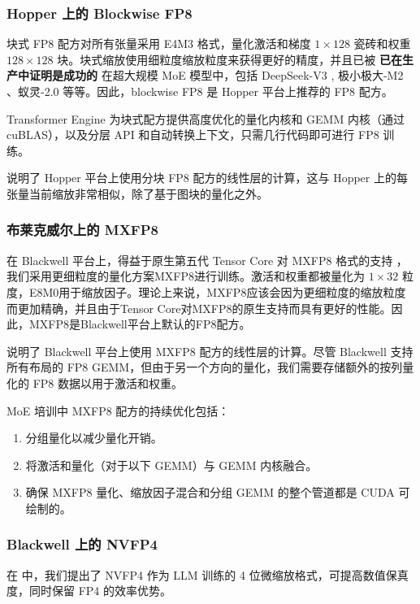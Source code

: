 \subsubsection{Hopper 上的 Blockwise FP8}
块式 FP8 配方对所有张量采用 E4M3 格式，量化激活和梯度 $1 \times 128$ 瓷砖和权重 $128 \times 128$ 块。块式缩放使用细粒度缩放粒度来获得更好的精度，并且已被 \textbf{已在生产中证明是成功的} 在超大规模 MoE 模型中，包括 DeepSeek-V3 \cite{deepseekai2025deepseekv3technicalreport}, 极小极大-M2 \cite{minimax_m2}、蚁灵-2.0 \cite{li2025every}等等。因此，blockwise FP8 是 Hopper 平台上推荐的 FP8 配方。

Transformer Engine 为块式配方提供高度优化的量化内核和 GEMM 内核（通过 cuBLAS），以及分层 API 和自动转换上下文，只需几行代码即可进行 FP8 训练。

 说明了 Hopper 平台上使用分块 FP8 配方的线性层的计算，这与 Hopper 上的每张量当前缩放非常相似，除了基于图块的量化之外。

\subsubsection{布莱克威尔上的 MXFP8}
在 Blackwell 平台上，得益于原生第五代 Tensor Core 对 MXFP8 格式的支持 \cite{rouhani2023microscalingdataformatsdeep}，我们采用更细粒度的量化方案MXFP8进行训练。激活和权重都被量化为 $1 \times 32$ 粒度，E8M0用于缩放因子。理论上来说，MXFP8应该会因为更细粒度的缩放粒度而更加精确，并且由于Tensor Core对MXFP8的原生支持而具有更好的性能。因此，MXFP8是Blackwell平台上默认的FP8配方。

 说明了 Blackwell 平台上使用 MXFP8 配方的线性层的计算。尽管 Blackwell 支持所有布局的 FP8 GEMM，但由于另一个方向的量化，我们需要存储额外的按列量化的 FP8 数据以用于激活和权重。

MoE 培训中 MXFP8 配方的持续优化包括：
\begin{enumerate}
    \item 分组量化以减少量化开销。
    \item 将激活和量化（对于以下 GEMM）与 GEMM 内核融合。
    \item 确保 MXFP8 量化、缩放因子混合和分组 GEMM 的整个管道都是 CUDA 可绘制的。
\end{enumerate}

\subsubsection{Blackwell 上的 NVFP4}

在 \cite{nvidia2025pretraininglargelanguagemodels}中，我们提出了 NVFP4 作为 LLM 训练的 4 位微缩放格式，可提高数值保真度，同时保留 FP4 的效率优势。 

